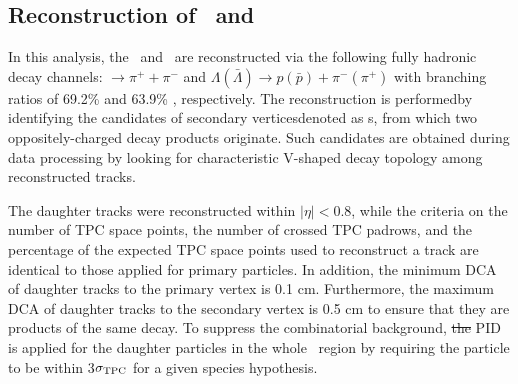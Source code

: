 \documentclass[ALICE,manyauthors]{cernphprep}
\providecommand{\DIFaddtex}[1]{{\protect\color{blue}\uwave{#1}}} %
\providecommand{\DIFdeltex}[1]{{\protect\color{red}\sout{#1}}}                      %
\providecommand{\DIFaddbegin}{} %
\providecommand{\DIFaddend}{} %
\providecommand{\DIFdelbegin}{} %
\providecommand{\DIFdelend}{} %
\providecommand{\DIFadd}[1]{\texorpdfstring{\DIFaddtex{#1}}{#1}} %
\providecommand{\DIFdel}[1]{\texorpdfstring{\DIFdeltex{#1}}{}} %
\begin{document}
\subsection{Reconstruction of \Ks\DIFaddbegin \DIFadd{, }\lambdas\DIFaddend ~and \DIFdelbegin %
\DIFdelend \DIFaddbegin \DIFadd{$\phi$ meson}\DIFaddend }
\DIFdelbegin %
\DIFdelend \DIFaddbegin \label{SubSec:K0sLambdaPhiRec}
\DIFaddend 



In this analysis, the \Ks~and \lambdas~are reconstructed via the following fully hadronic decay channels: \Ks $\rightarrow \pi^{+} + \pi^{-}$ and  $\Lambda(\bar{\Lambda})\rightarrow p(\bar{p})+\pi^{-}(\pi^{+})$ with branching ratios of 69.2\% and 63.9\% \cite{Olive_2016}, respectively. The reconstruction is performed\DIFaddbegin \DIFadd{, as shown in Tab. \ref{tab:V0scuts}, }\DIFaddend by identifying the candidates of secondary vertices\DIFaddbegin \DIFadd{, }\DIFaddend denoted as \vo s, from which two oppositely-charged decay products originate. Such candidates are obtained during data processing by looking for characteristic V-shaped decay topology among reconstructed tracks.

The daughter tracks were reconstructed within $|\eta|<0.8$, while the criteria on the number of TPC space points, the number of crossed TPC padrows, and the percentage of the expected TPC space points used to reconstruct a track are identical to those applied for primary particles. In addition, the minimum DCA of daughter tracks to the primary vertex is 0.1 cm. Furthermore, the maximum DCA of daughter tracks to the secondary vertex is 0.5 cm to ensure that they are products of the same decay. To suppress the combinatorial background, \DIFdelbegin \DIFdel{the }\DIFdelend PID is applied for the daughter particles in the whole \pT~region by requiring the particle to be within 3$\sigma_{\rm TPC}$ for a given species hypothesis.
\end{document}

